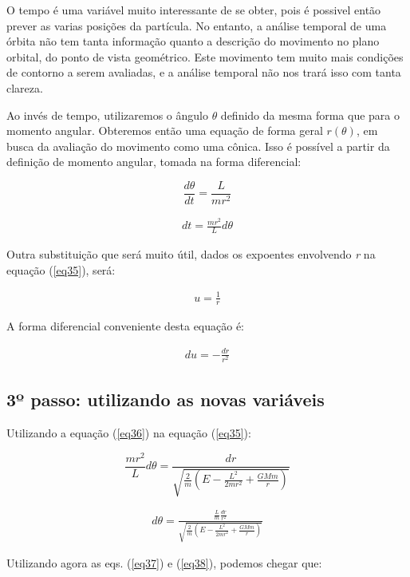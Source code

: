 O tempo é uma variável muito interessante de se obter, pois é possivel então prever as varias posições da partícula. No entanto, a análise temporal de uma órbita não tem tanta informação quanto a descrição do movimento no plano orbital, do ponto de vista geométrico. Este movimento tem muito mais condições de contorno a serem avaliadas, e a análise temporal não nos trará isso com tanta clareza. {\\}

Ao invés de tempo, utilizaremos o ângulo $\theta$ definido da mesma forma que para o momento angular. Obteremos então uma equação de forma geral $r(\theta)$, em busca da avaliação do movimento como uma cônica. Isso é possível a partir da definição de momento angular, tomada na forma diferencial:

\[
	\frac{d\theta}{dt} = \frac{L}{mr^2}
\]

\begin{eqnarray}
	dt = \frac{mr^2}{L}d\theta \label{eq36}
\end{eqnarray}

Outra substituição que será muito útil, dados os expoentes envolvendo \textit{r} na equação (\ref{eq35}), será:

\begin{eqnarray}
	u = \frac{1}{r} \label{eq37}
\end{eqnarray}

A forma diferencial conveniente desta equação é:

\begin{eqnarray}
	du = -\frac{dr}{r^2} \label{eq38}
\end{eqnarray}

\subsection{3º passo: utilizando as novas variáveis}

Utilizando a equação (\ref{eq36}) na equação (\ref{eq35}):

\[
	\frac{mr^2}{L}d\theta = \frac{dr}{\sqrt{\frac{2}{m}\left(E - \frac{L^2}{2mr^2} + \frac{GMm}{r}\right)}}
\]

\begin{eqnarray}
	d\theta = \frac{\frac{L}{m}\frac{dr}{r^2}}{\sqrt{\frac{2}{m}\left(E - \frac{L^2}{2mr^2} + \frac{GMm}{r}\right)}} \label{eq39}
\end{eqnarray}

Utilizando agora as eqs. (\ref{eq37}) e (\ref{eq38}), podemos chegar que:  

